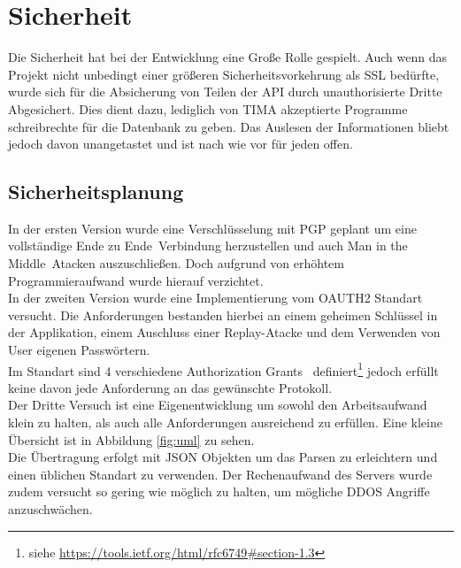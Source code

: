 \section{Sicherheit}
Die Sicherheit hat bei der Entwicklung eine Große Rolle gespielt.  Auch wenn
das Projekt nicht unbedingt einer größeren Sicherheitsvorkehrung als SSL
bedürfte, wurde sich für die Absicherung von Teilen der API durch
unauthorisierte Dritte Abgesichert. Dies dient dazu, lediglich von TIMA
akzeptierte Programme schreibrechte für die Datenbank zu geben.  Das Auslesen
der Informationen bliebt jedoch davon unangetastet und ist nach wie vor für
jeden offen.

\subsection*{Sicherheitsplanung}
In der ersten Version wurde eine Verschlüsselung mit PGP geplant um eine
vollständige \glqq Ende zu Ende\grqq~Verbindung herzustellen und auch \glqq Man
in the Middle\grqq~Atacken auszuschließen. Doch aufgrund von erhöhtem
Programmieraufwand wurde hierauf verzichtet.\\

In der zweiten Version wurde eine Implementierung vom OAUTH2 Standart versucht.
Die Anforderungen bestanden hierbei an einem geheimen Schlüssel in der
Applikation, einem Auschluss einer Replay-Atacke und dem Verwenden von
User eigenen Passwörtern.\\
Im Standart sind 4 verschiedene \glqq Authorization Grants\grqq~
definiert\footnote{siehe \url{https://tools.ietf.org/html/rfc6749\#section-1.3}}
jedoch erfüllt keine davon jede Anforderung an das gewünschte Protokoll.\\

Der Dritte Versuch ist eine Eigenentwicklung um sowohl den Arbeitsaufwand
klein zu halten, als auch alle Anforderungen ausreichend zu erfüllen.
Eine kleine Übersicht ist in Abbildung \ref{fig:uml} zu sehen.\\
Die Übertragung erfolgt mit JSON Objekten um das Parsen zu erleichtern und
einen üblichen Standart zu verwenden. Der Rechenaufwand des Servers wurde
zudem versucht so gering wie möglich zu halten, um mögliche DDOS Angriffe
anzuschwächen.


